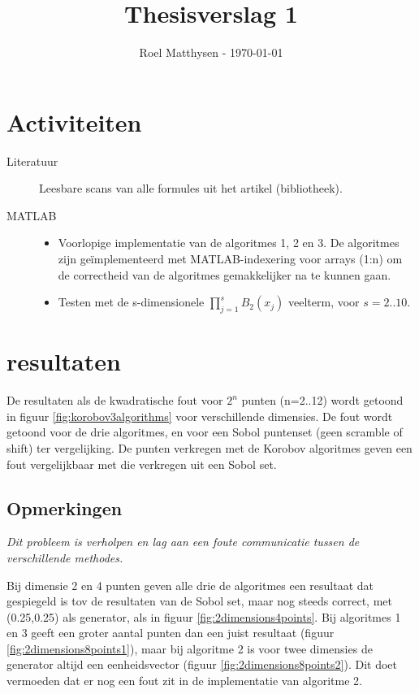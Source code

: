\documentclass[a4paper, 10pt]{article}
\title{Thesisverslag 1}
\author{Roel Matthysen - \today}
\date{}
\begin{document}
\maketitle

\section{Activiteiten}
\begin{description}
\item[Literatuur] \hfill\begin{itemize} Leesbare scans van alle formules uit het artikel (bibliotheek).\end{itemize}
\item[MATLAB] \hfill\begin{itemize}
\item Voorlopige implementatie van de algoritmes 1, 2 en 3. De algoritmes zijn ge\"implementeerd met MATLAB-indexering voor arrays (1:n) om de correctheid van de algoritmes gemakkelijker na te kunnen gaan.
\item Testen met de s-dimensionele $\prod_{j=1}^s B_2(x_j)$ veelterm, voor $s=2..10$.
\end{itemize}
\end{description}
\section{resultaten}
De resultaten als de kwadratische fout voor $2^n$ punten (n=2..12) wordt getoond in figuur \ref{fig:korobov3algorithms} voor verschillende dimensies. De fout wordt getoond voor de drie algoritmes, en voor een Sobol puntenset (geen scramble of shift)  ter vergelijking. De punten verkregen met de Korobov algoritmes geven een fout vergelijkbaar met die verkregen uit een Sobol set. 

\subsection{Opmerkingen}
\emph{Dit probleem is verholpen en lag aan een foute communicatie tussen de verschillende methodes.}

\hfill\newline
\noindent Bij dimensie 2 en 4 punten geven alle drie de algoritmes een resultaat dat gespiegeld is tov de resultaten van de Sobol set, maar nog steeds correct, met (0.25,0.25) als generator, als in figuur \ref{fig:2dimensions4points}. Bij algoritmes 1 en 3  geeft een groter aantal punten dan een juist resultaat (figuur \ref{fig:2dimensions8points1}), maar bij algoritme 2 is voor twee dimensies de generator altijd een eenheidsvector (figuur \ref{fig:2dimensions8points2}). Dit doet vermoeden dat er nog een fout zit in de implementatie van algoritme 2.
\end{document}
